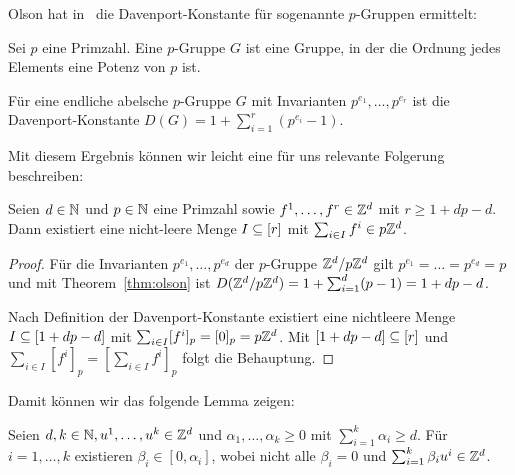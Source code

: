 Olson hat in~\cite{Olson1969} die Davenport-Konstante für sogenannte $p$-Gruppen ermittelt:
\begin{definition}[$p$-Gruppe]
	Sei $p$ eine Primzahl.
	Eine $p$-Gruppe $G$ ist eine Gruppe, in der die Ordnung jedes Elements eine Potenz von $p$ ist.
\end{definition}

\begin{theorem}[Olson]\label{thm:olson}
	Für eine endliche abelsche $p$-Gruppe $G$ mit Invarianten $p^{e_1},\dots,p^{e_r}$ ist die Davenport-Konstante $D(G)=1+\sum_{i=1}^r(p^{e_i}-1)$. 
\end{theorem}

Mit diesem Ergebnis können wir leicht eine für uns relevante Folgerung beschreiben:

\begin{corollary}
	Seien $d\in\mathbb{N}$ und $p\in\mathbb{N}$ eine Primzahl sowie $f^1,\dots,f^r\in\mathbb{Z}^d$ mit $r\geq 1+dp-d$. Dann existiert eine nicht-leere Menge $I\subseteq[r]$ mit $\sum_{i\in I}f^i\in p\mathbb{Z}^d$.
\end{corollary}
\begin{proof}
	Für die Invarianten $p^{e_1},\dots,p^{e_d}$ der $p$-Gruppe $\mathbb{Z}^d/p\mathbb{Z}^d$ gilt $p^{e_1}=\dots=p^{e_d}=p$ und mit Theorem~\ref{thm:olson} ist $D(\mathbb{Z}^d/p\mathbb{Z}^d)=1+\sum_{i=1}^d(p-1)=1+dp-d$.
	
	Nach Definition der Davenport-Konstante existiert eine nichtleere Menge $I\subseteq[1+dp-d]$ mit $\sum_{i\in I}[f^i]_p=[0]_p=p\mathbb{Z}^d$.
	Mit $[1+dp-d]\subseteq[r]$ und $\sum_{i\in I}[f^i]_p=[\sum_{i\in I}f^i]_p$ folgt die Behauptung.
\end{proof}

Damit können wir das folgende Lemma zeigen:

\begin{lemma}
	Seien $d,k\in\mathbb{N}, u^1,\dots, u^k\in\mathbb{Z}^d$ und $\alpha_1,\dots,\alpha_k\geq0$ mit $\sum_{i=1}^k \alpha_i\geq d$.
	Für $i=1,\dots,k$ existieren $\beta_i\in[0,\alpha_i]$, wobei nicht alle $\beta_i=0$ und $\sum_{i=1}^k\beta_i u^i \in\mathbb{Z}^d$.
\end{lemma}